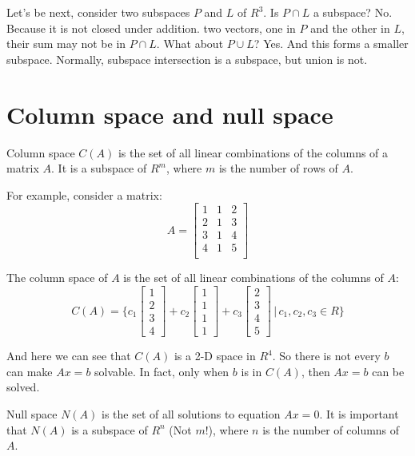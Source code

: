 \documentclass[10pt,a4paper,oneside,numbers=noenddot]{scrbook}
\theoremstyle{ctplain}
\theoremstyle{ctresult}
\begin{document}
Let's be next, consider two subspaces $P$ and $L$ of $R^{3}$. Is $P \cap L$ a subspace?
No. Because it is not closed under addition. two vectors, one in $P$ and the other in $L$,
their sum may not be in $P \cap L$. What about $P \cup L$? Yes. And this forms a smaller
subspace. Normally, subspace intersection is a subspace, but union is not.

\section{Column space and null space}

Column space $C(A)$ is the set of all linear combinations of the columns of a matrix
$A$. It is a subspace of $R^{m}$, where $m$ is the number of rows of $A$.

For example, consider a matrix:
\[
  A = \begin{bmatrix}
    1 & 1 & 2 \\
    2 & 1 & 3 \\
    3 & 1 & 4 \\
    4 & 1 & 5 \\
  \end{bmatrix}
\]

The column space of $A$ is the set of all linear combinations of the columns of $A$:
\[
  C(A) = \{ c_1 \begin{bmatrix} 1 \\ 2 \\ 3 \\ 4 \end{bmatrix} +
           c_2 \begin{bmatrix} 1 \\ 1 \\ 1 \\ 1 \end{bmatrix} +
           c_3 \begin{bmatrix} 2 \\ 3 \\ 4 \\ 5 \end{bmatrix}
           \,|\, c_1, c_2, c_3 \in R \}
\]

And here we can see that $C(A)$ is a 2-D space in $R^{4}$. So there is not every $b$
can make $Ax = b$ solvable. In fact, only when $b$ is in $C(A)$, then $Ax = b$ can be
solved.

Null space $N(A)$ is the set of all solutions to equation $Ax = 0$. It is important
that $N(A)$ is a subspace of $R^{n}$ (Not $m$!), where $n$ is the number of columns of
$A$.
\end{document}
